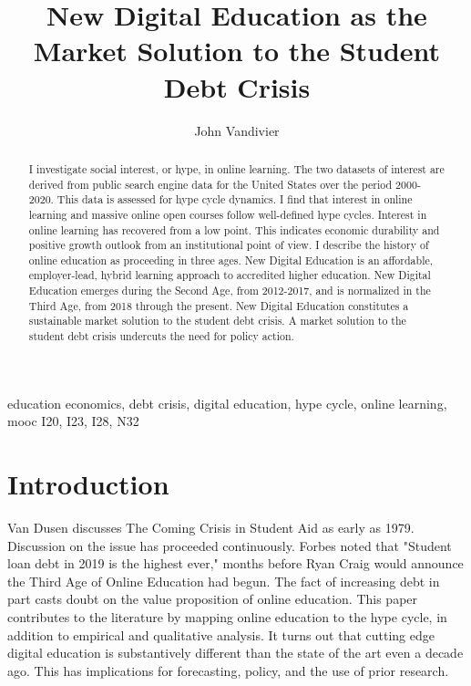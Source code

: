 \documentclass[review]{elsarticle}
\begin{document}
\begin{frontmatter}

\title{
    New Digital Education as the Market Solution to the Student Debt Crisis
}


\author[mymainaddress]{John Vandivier}
\address[mymainaddress]{4400 University Dr, Fairfax, VA 22030}

\begin{abstract}
    I investigate social interest, or hype, in online learning.
    The two datasets of interest are derived from public search engine data for the United States over the period 2000-2020.
    This data is assessed for hype cycle dynamics.
    I find that interest in online learning and massive online open courses follow well-defined hype cycles.
    Interest in online learning has recovered from a low point.
    This indicates economic durability and positive growth outlook from an institutional point of view.
    I describe the history of online education as proceeding in three ages.
    New Digital Education is an affordable, employer-lead, hybrid learning approach to accredited higher education.
    New Digital Education emerges during the Second Age, from 2012-2017, and is normalized in the Third Age, from 2018 through the present.
    New Digital Education constitutes a sustainable market solution to the student debt crisis.
    A market solution to the student debt crisis undercuts the need for policy action.
\end{abstract}

\begin{keyword}
education economics, debt crisis, digital education, hype cycle, online learning, mooc
\MSC[2010] I20, I23, I28, N32
\end{keyword}

\end{frontmatter}

\pagebreak
\linenumbers
        
    \section{Introduction}

    Van Dusen discusses The Coming Crisis in Student Aid as early as 1979\cite{van1979coming}.
    Discussion on the issue has proceeded continuously.
    Forbes\cite{friedman2019student} noted that "Student loan debt in 2019 is the highest ever,"
    months before Ryan Craig would announce the Third Age of Online Education had begun\cite{craig2019welcome}.
    The fact of increasing debt in part casts doubt on the value proposition of online education.
    This paper contributes to the literature by mapping online education to the hype cycle, in addition to empirical and qualitative analysis.
    It turns out that cutting edge digital education is substantively different than the state of the art even a decade ago.
    This has implications for forecasting, policy, and the use of prior research.
\end{document}
